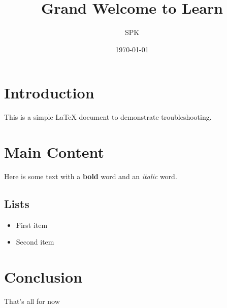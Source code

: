 \documentclass{article}
\begin{document}
	\title{Grand Welcome to Learn}
	\author{SPK}
	\date{\today}
	\maketitle
	\section{Introduction}
	This is a simple LaTeX document to demonstrate troubleshooting.
	\section{Main Content}
	Here is some text with a \textbf{bold} word and an \emph{italic} word.
	\subsection{Lists}
	\begin{itemize}
		\item First item
		\item Second item
	\end{itemize}
	\section{Conclusion}
	That’s all for now
\end{document}
